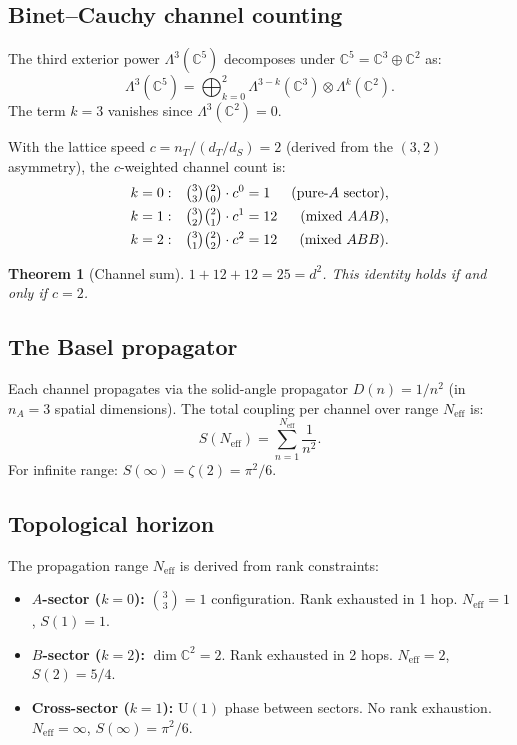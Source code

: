 \documentclass[12pt]{amsart}
\newtheorem{theorem}{Theorem}[section]
\theoremstyle{definition}
\theoremstyle{remark}
\newcommand{\CC}{\mathbb{C}}
\begin{document}
\subsection{Binet--Cauchy channel counting}

The third exterior power
$\Lambda^3(\CC^5)$ decomposes under
$\CC^5 = \CC^3 \oplus \CC^2$ as:
\begin{equation}
\Lambda^3(\CC^5)
= \bigoplus_{k=0}^{2}
  \Lambda^{3-k}(\CC^3) \otimes \Lambda^k(\CC^2).
\end{equation}
The term $k = 3$ vanishes since
$\Lambda^3(\CC^2) = 0$.

With the lattice speed $c = n_T / (d_T / d_S)
= 2$ (derived from the $(3,2)$ asymmetry),
the $c$-weighted channel count is:
\begin{align}
k = 0: &\quad
  \tbinom{3}{3}\tbinom{2}{0} \cdot c^0
  = 1
  & \text{(pure-$A$ sector)}, \\
k = 1: &\quad
  \tbinom{3}{2}\tbinom{2}{1} \cdot c^1
  = 12
  & \text{(mixed $AAB$)}, \\
k = 2: &\quad
  \tbinom{3}{1}\tbinom{2}{2} \cdot c^2
  = 12
  & \text{(mixed $ABB$)}.
\end{align}

\begin{theorem}[Channel sum]
\label{thm:25}
$1 + 12 + 12 = 25 = d^2$.
This identity holds if and only if $c = 2$.
\end{theorem}

\subsection{The Basel propagator}

Each channel propagates via the
solid-angle propagator $D(n) = 1/n^2$
(in $n_A = 3$ spatial dimensions).
The total coupling per channel over
range $N_{\mathrm{eff}}$ is:
\begin{equation}
S(N_{\mathrm{eff}})
= \sum_{n=1}^{N_{\mathrm{eff}}} \frac{1}{n^2}.
\end{equation}
For infinite range:
$S(\infty) = \zeta(2) = \pi^2/6$.

\subsection{Topological horizon}

The propagation range $N_{\mathrm{eff}}$
is derived from rank constraints:

\begin{itemize}
\item \textbf{$A$-sector ($k=0$):}
  $\binom{3}{3} = 1$ configuration.
  Rank exhausted in 1 hop.
  $N_{\mathrm{eff}} = 1$, $S(1) = 1$.

\item \textbf{$B$-sector ($k=2$):}
  $\dim \CC^2 = 2$.
  Rank exhausted in 2 hops.
  $N_{\mathrm{eff}} = 2$, $S(2) = 5/4$.

\item \textbf{Cross-sector ($k=1$):}
  $\mathrm{U}(1)$ phase between sectors.
  No rank exhaustion.
  $N_{\mathrm{eff}} = \infty$,
  $S(\infty) = \pi^2/6$.
\end{itemize}
\end{document}
